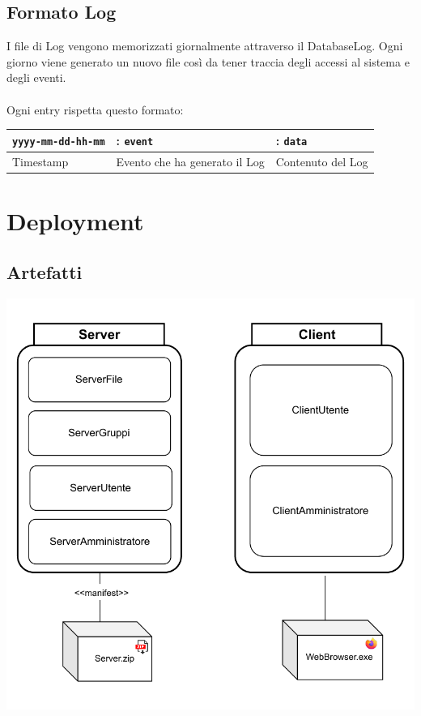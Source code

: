 {}
\vspace{0.5cm}


\subsection*{Formato Log}
I file di Log vengono memorizzati giornalmente attraverso il DatabaseLog. Ogni giorno viene generato un nuovo file così da tener traccia degli accessi al sistema e degli eventi.\\
\\
Ogni entry rispetta questo formato:\\

    \begin{tabular}{|p{3cm} p{3cm} p{3cm}|}
    \hline
    \verb |yyyy-mm-dd-hh-mm| & : \verb|event| & : \verb|data|\\
    \hline
    Timestamp   & Evento che ha generato il Log & Contenuto del Log \\
    \hline
    \end{tabular}


\pagebreak
\section*{Deployment}
{}
\subsection*{Artefatti}
\vspace{1cm}
{}
\vspace{0.5cm}
\begin{adjustwidth}{0cm}{0cm}
\includegraphics[scale=1]{deployment/Diagramma-Sequenza-Artefatti.drawio.pdf}
\end{adjustwidth}

